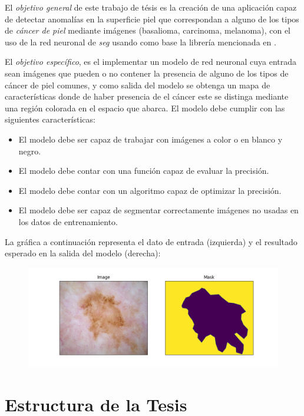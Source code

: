 El \emph{objetivo general} de este trabajo de tésis es la creación de una aplicación capaz de detectar anomalías en la superficie piel que correspondan a alguno de los tipos de \emph{cáncer de piel} mediante imágenes (basalioma, carcinoma, melanoma), con el uso de la red neuronal de \emph{\gls{seg}} usando como base la librería mencionada en \citet{wu2019fastfcn}. 


El \emph{objetivo específico}, es el implementar un modelo de red neuronal cuya entrada sean imágenes que pueden o no contener la presencia de alguno de los tipos de cáncer de piel comunes, y como salida del modelo se obtenga un mapa de características donde de haber presencia de el cáncer este se distinga mediante una región colorada en el espacio que abarca. El modelo debe cumplir con las siguientes características:

\begin{itemize}
    \item El modelo debe ser capaz de trabajar con imágenes a color o en blanco y negro.
    \item El modelo debe contar con una función capaz de evaluar la precisión.
    \item El modelo debe contar con un algoritmo capaz de optimizar la precisión.
    \item El modelo debe ser capaz de segmentar correctamente imágenes no usadas en los datos de entrenamiento.
\end{itemize}

La gráfica a continuación representa el dato de entrada (izquierda) y el resultado esperado en la salida del modelo (derecha):

\begin{figure}[h!]
    \includegraphics[width=150mm]{Figuras/plot_masks.png}
    \centering
    \caption{}
    \label{fig:desired}
\end{figure}

\section{Estructura de la Tesis}

